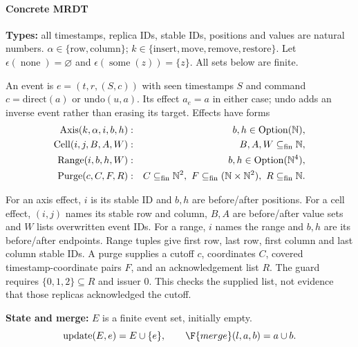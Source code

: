 \paragraph{Concrete MRDT}
\textbf{Types:} all timestamps, replica IDs, stable IDs, positions and values are natural numbers. $\alpha\in\{\mathrm{row},\mathrm{column}\}$; $k\in\{\mathrm{insert},\mathrm{move},\mathrm{remove},\mathrm{restore}\}$. Let $\epsilon(\operatorname{none})=\varnothing$ and $\epsilon(\operatorname{some}(z))=\{z\}$. All sets below are finite.

An event is $e=(t,r,(S,c))$ with seen timestamps $S$ and command $c=\mathrm{direct}(a)$ or $\mathrm{undo}(u,a)$. Its effect $a_e=a$ in either case; undo adds an inverse event rather than erasing its target. Effects have forms
\[
\begin{aligned}\mathrm{Axis}(k,\alpha,i,b,h)&:&b,h\in\operatorname{Option}(\mathbb N),\\\mathrm{Cell}(i,j,B,A,W)&:&B,A,W\subseteq_{\rm fin}\mathbb N,\\\mathrm{Range}(i,b,h,W)&:&b,h\in\operatorname{Option}(\mathbb N^4),\\\mathrm{Purge}(c,C,F,R)&:&C\subseteq_{\rm fin}\mathbb N^2,\ F\subseteq_{\rm fin}(\mathbb N\times\mathbb N^2),\ R\subseteq_{\rm fin}\mathbb N.\end{aligned}
\]

For an axis effect, $i$ is its stable ID and $b,h$ are before/after
positions. For a cell effect, $(i,j)$ names its stable row and column,
$B,A$ are before/after value sets and $W$ lists overwritten event IDs.
For a range, $i$ names the range and $b,h$ are its before/after endpoints.
Range tuples give first row, last row, first column and last column stable IDs.
A purge supplies a cutoff $c$, coordinates $C$, covered timestamp-coordinate
pairs $F$, and an acknowledgement list $R$. The guard requires
$\{0,1,2\}\subseteq R$ and issuer $0$. This checks the supplied list, not
evidence that those replicas acknowledged the cutoff.

\textbf{State and merge:} $E$ is a finite event set, initially empty.
\[
\operatorname{update}(E,e)=E\cup\{e\},\qquad\F{merge}(l,a,b)=a\cup b.
\]



